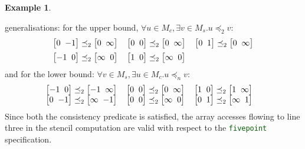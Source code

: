 \documentclass[9pt]{sigplanconf}
\newcounter{block}
\theoremstyle{definition}
\newtheorem{example}[block]{Example}
\newcommand{\vtwoh}[2]{\setlength{\arraycolsep}{0em}
\left[\begin{array}{cc}#1 \; & \; #2\end{array}\right]}
\begin{document}
\begin{example}
\begin{enumerate}
  generalisations: for the upper bound, $\forall u \in M_c,
  \exists v \in M_s . u \preceq_2 v$: 
  \begin{align}
    \begin{array}{l}
     \vtwoh{0}{-1} \preceq_2 \vtwoh{0}{\infty} \quad
     \vtwoh{0}{0} \preceq_2 \vtwoh{0}{\infty} \quad
     \vtwoh{0}{1} \preceq_2 \vtwoh{0}{\infty} \\[0.5em]
     \vtwoh{-1}{0} \preceq_2 \vtwoh{\infty}{0} \quad
     \vtwoh{1}{0} \preceq_2 \vtwoh{\infty}{0}
     \end{array}
  \label{eq:check-example-upper}
  \end{align}
  and for the lower bound: $\forall v \in M_s, \exists u \in M_c . u
  \preceq_n v$: 
  \begin{align}
    \hspace{-1em}
    \begin{array}{l}
     \vtwoh{-1}{0} \preceq_2 \vtwoh{-1}{\infty} \quad
     \vtwoh{0}{0} \preceq_2 \vtwoh{0}{\infty} \quad
     \vtwoh{1}{0} \preceq_2 \vtwoh{1}{\infty}  \\
     \vtwoh{0}{-1}  \preceq_2 \vtwoh{\infty}{-1} \quad
     \vtwoh{0}{0}  \preceq_2 \vtwoh{\infty}{0} \quad
     \vtwoh{0}{1}  \preceq_2 \vtwoh{\infty}{1}
     \end{array}
    \label{eq:check-example-lower}
  \end{align}
  Since both the consistency predicate is satisfied, the array
  accesses flowing to line three in the stencil computation are valid
  with respect to the {\textcolor{darkgreen}{\texttt{fivepoint}}} specification.
\end{enumerate}
\vspace{-0.7em}
\end{example}
\end{document}
